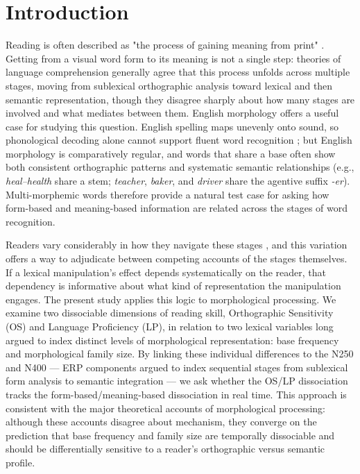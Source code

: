 \section{Introduction}

	Reading is often described as "the process of gaining meaning from print" \citep[][p.~34]{raynerHowPsychologicalScience2001}. Getting from a visual word form to its meaning is not a single step: theories of language comprehension generally agree that this process unfolds across multiple stages, moving from sublexical orthographic analysis toward lexical and then semantic representation, though they disagree sharply about how many stages are involved and what mediates between them. English morphology offers a useful case for studying this question. English spelling maps unevenly onto sound, so phonological decoding alone cannot support fluent word recognition \citep{zieglerReadingAcquisitionDevelopmental2005, castlesHowDoesOrthographic2006}; but English morphology is comparatively regular, and words that share a base often show both consistent orthographic patterns and systematic semantic relationships (e.g., \textit{heal--health} share a stem; \textit{teacher}, \textit{baker}, and \textit{driver} share the agentive suffix \textit{-er}). Multi-morphemic words therefore provide a natural test case for asking how form-based and meaning-based information are related across the stages of word recognition.

	Readers vary considerably in how they navigate these stages \citep{perfettiReadingAbilityLexical2007, castlesHowDoesOrthographic2006, stanovichExposurePrintOrthographic1989}, and this variation offers a way to adjudicate between competing accounts of the stages themselves. If a lexical manipulation's effect depends systematically on the reader, that dependency is informative about what kind of representation the manipulation engages. The present study applies this logic to morphological processing. We examine two dissociable dimensions of reading skill, Orthographic Sensitivity (OS) and Language Proficiency (LP), in relation to two lexical variables long argued to index distinct levels of morphological representation: base frequency and morphological family size. By linking these individual differences to the N250 and N400 --- ERP components argued to index sequential stages from sublexical form analysis to semantic integration --- we ask whether the OS/LP dissociation tracks the form-based/meaning-based dissociation in real time. This approach is consistent with the major theoretical accounts of morphological processing: although these accounts disagree about mechanism, they converge on the prediction that base frequency and family size are temporally dissociable and should be differentially sensitive to a reader's orthographic versus semantic profile.

